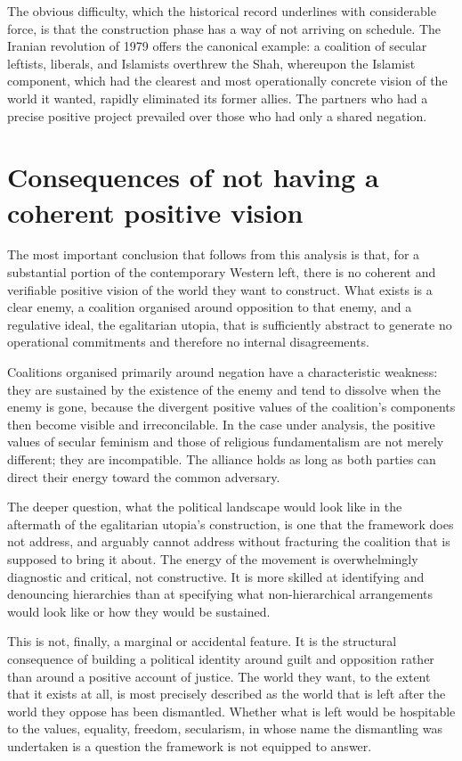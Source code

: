 \documentclass[12pt,a4paper]{article}
\begin{document}
	The obvious difficulty, which the historical record underlines with considerable
	force, is that the construction phase has a way of not arriving on schedule. The
	Iranian revolution of 1979 offers the canonical example: a coalition of secular
	leftists, liberals, and Islamists overthrew the Shah, whereupon the Islamist
	component, which had the clearest and most operationally concrete vision of the
	world it wanted, rapidly eliminated its former allies. The partners who had a precise
	positive project prevailed over those who had only a shared negation.
	
	\section{Consequences of not having a coherent positive vision}
	
	The most important conclusion that follows from this analysis is that, for a
	substantial portion of the contemporary Western left, there is no coherent and
	verifiable positive vision of the world they want to construct. What exists is a
	clear enemy, a coalition organised around opposition to that enemy, and a regulative
	ideal, the egalitarian utopia, that is sufficiently abstract to generate no
	operational commitments and therefore no internal disagreements.
	
	Coalitions organised primarily around negation have a characteristic weakness: they
	are sustained by the existence of the enemy and tend to dissolve when the enemy is
	gone, because the divergent positive values of the coalition's components then
	become visible and irreconcilable. In the case under analysis, the positive values
	of secular feminism and those of religious fundamentalism are not merely different;
	they are incompatible. The alliance holds as long as both parties can direct their
	energy toward the common adversary.
	
	The deeper question, what the political landscape would look like in the aftermath
	of the egalitarian utopia's construction, is one that the framework does not
	address, and arguably cannot address without fracturing the coalition that is
	supposed to bring it about. The energy of the movement is overwhelmingly diagnostic
	and critical, not constructive. It is more skilled at identifying and denouncing
	hierarchies than at specifying what non-hierarchical arrangements would look like or
	how they would be sustained.
	
	This is not, finally, a marginal or accidental feature. It is the structural
	consequence of building a political identity around guilt and opposition rather than
	around a positive account of justice. The world they want, to the extent that it
	exists at all, is most precisely described as the world that is left after the
	world they oppose has been dismantled. Whether what is left would be hospitable to
	the values, equality, freedom, secularism, in whose name the dismantling was
	undertaken is a question the framework is not equipped to answer.
	
\end{document}

